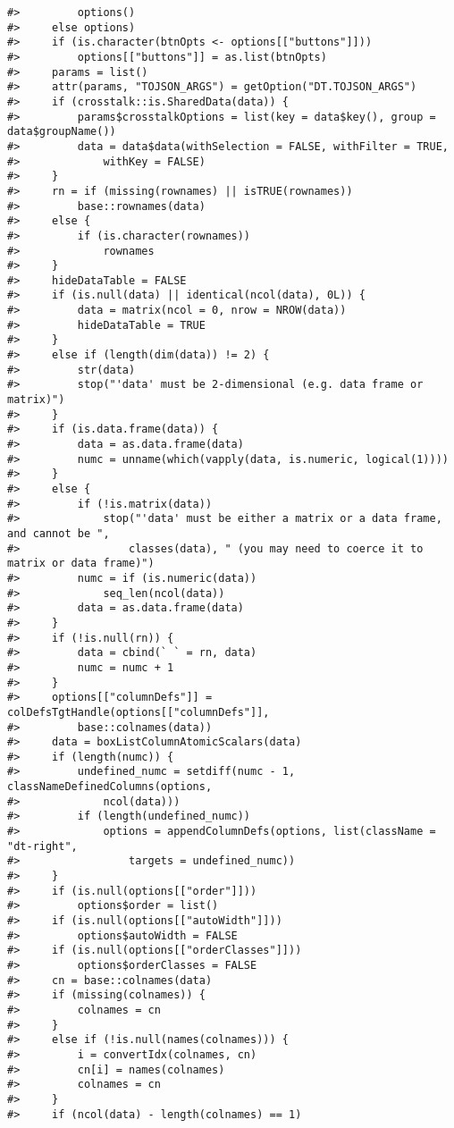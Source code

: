 \documentclass[
]{book}
\begin{document}
\begin{verbatim}
#>         options()
#>     else options)
#>     if (is.character(btnOpts <- options[["buttons"]])) 
#>         options[["buttons"]] = as.list(btnOpts)
#>     params = list()
#>     attr(params, "TOJSON_ARGS") = getOption("DT.TOJSON_ARGS")
#>     if (crosstalk::is.SharedData(data)) {
#>         params$crosstalkOptions = list(key = data$key(), group = data$groupName())
#>         data = data$data(withSelection = FALSE, withFilter = TRUE, 
#>             withKey = FALSE)
#>     }
#>     rn = if (missing(rownames) || isTRUE(rownames)) 
#>         base::rownames(data)
#>     else {
#>         if (is.character(rownames)) 
#>             rownames
#>     }
#>     hideDataTable = FALSE
#>     if (is.null(data) || identical(ncol(data), 0L)) {
#>         data = matrix(ncol = 0, nrow = NROW(data))
#>         hideDataTable = TRUE
#>     }
#>     else if (length(dim(data)) != 2) {
#>         str(data)
#>         stop("'data' must be 2-dimensional (e.g. data frame or matrix)")
#>     }
#>     if (is.data.frame(data)) {
#>         data = as.data.frame(data)
#>         numc = unname(which(vapply(data, is.numeric, logical(1))))
#>     }
#>     else {
#>         if (!is.matrix(data)) 
#>             stop("'data' must be either a matrix or a data frame, and cannot be ", 
#>                 classes(data), " (you may need to coerce it to matrix or data frame)")
#>         numc = if (is.numeric(data)) 
#>             seq_len(ncol(data))
#>         data = as.data.frame(data)
#>     }
#>     if (!is.null(rn)) {
#>         data = cbind(` ` = rn, data)
#>         numc = numc + 1
#>     }
#>     options[["columnDefs"]] = colDefsTgtHandle(options[["columnDefs"]], 
#>         base::colnames(data))
#>     data = boxListColumnAtomicScalars(data)
#>     if (length(numc)) {
#>         undefined_numc = setdiff(numc - 1, classNameDefinedColumns(options, 
#>             ncol(data)))
#>         if (length(undefined_numc)) 
#>             options = appendColumnDefs(options, list(className = "dt-right", 
#>                 targets = undefined_numc))
#>     }
#>     if (is.null(options[["order"]])) 
#>         options$order = list()
#>     if (is.null(options[["autoWidth"]])) 
#>         options$autoWidth = FALSE
#>     if (is.null(options[["orderClasses"]])) 
#>         options$orderClasses = FALSE
#>     cn = base::colnames(data)
#>     if (missing(colnames)) {
#>         colnames = cn
#>     }
#>     else if (!is.null(names(colnames))) {
#>         i = convertIdx(colnames, cn)
#>         cn[i] = names(colnames)
#>         colnames = cn
#>     }
#>     if (ncol(data) - length(colnames) == 1) 

\end{verbatim}
\end{document}
